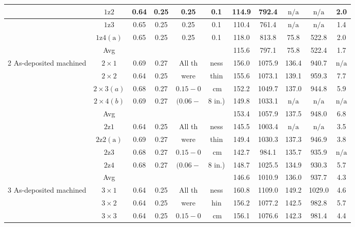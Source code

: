 \documentclass[10pt]{article}
\begin{document}
\begin{center}
\begin{tabular}{|c|c|c|c|c|c|c|c|c|c|c|}
\hline
 & $1 \mathrm{z} 2$ & 0.64 & 0.25 & 0.25 & 0.1 & 114.9 & 792.4 & $\mathrm{n} / \mathrm{a}$ & $\mathrm{n} / \mathrm{a}$ & 2.0 \\
\hline
 & $1 \mathrm{z} 3$ & 0.65 & 0.25 & 0.25 & 0.1 & 110.4 & 761.4 & $\mathrm{n} / \mathrm{a}$ & $\mathrm{n} / \mathrm{a}$ & 1.4 \\
\hline
 & $1 \mathrm{z} 4(\mathrm{a})$ & 0.65 & 0.25 & 0.25 & 0.1 & 118.0 & 813.8 & 75.8 & 522.8 & 2.0 \\
\hline
 & Avg &  &  &  &  & 115.6 & 797.1 & 75.8 & 522.4 & 1.7 \\
\hline
\multirow[t]{10}{*}{2 As-deposited machined} & $2 \times 1$ & 0.69 & 0.27 & All th & ness & 156.0 & 1075.9 & 136.4 & 940.7 & $\mathrm{n} / \mathrm{a}$ \\
\hline
 & $2 \times 2$ & 0.64 & 0.25 & were & thin & 155.6 & 1073.1 & 139.1 & 959.3 & 7.7 \\
\hline
 & $2 \times 3(a)$ & 0.68 & 0.27 & $0.15-0$ & $\mathrm{~cm}$ & 152.2 & 1049.7 & 137.0 & 944.8 & 5.9 \\
\hline
 & $2 \times 4(b)$ & 0.69 & 0.27 & $(0.06-$ & 8 in.) & 149.8 & 1033.1 & $\mathrm{n} / \mathrm{a}$ & $\mathrm{n} / \mathrm{a}$ & $\mathrm{n} / \mathrm{a}$ \\
\hline
 & Avg &  &  &  &  & 153.4 & 1057.9 & 137.5 & 948.0 & 6.8 \\
\hline
 & $2 \mathrm{z} 1$ & 0.64 & 0.25 & All th & ness & 145.5 & 1003.4 & $\mathrm{n} / \mathrm{a}$ & $\mathrm{n} / \mathrm{a}$ & 3.5 \\
\hline
 & $2 \mathrm{z} 2(\mathrm{a})$ & 0.69 & 0.27 & were & thin & 149.4 & 1030.3 & 137.3 & 946.9 & 3.8 \\
\hline
 & $2 \mathrm{z} 3$ & 0.68 & 0.27 & $0.15-0$ & $\mathrm{~cm}$ & 142.7 & 984.1 & 135.7 & 935.9 & $\mathrm{n} / \mathrm{a}$ \\
\hline
 & $2 \mathrm{z} 4$ & 0.68 & 0.27 & $(0.06-$ & 8 in.) & 148.7 & 1025.5 & 134.9 & 930.3 & 5.7 \\
\hline
 & Avg &  &  &  &  & 146.6 & 1010.9 & 136.0 & 937.7 & 4.3 \\
\hline
\multirow[t]{11}{*}{3 As-deposited machined} & $3 \times 1$ & 0.64 & 0.25 & All th & ness & 160.8 & 1109.0 & 149.2 & 1029.0 & 4.6 \\
\hline
 & $3 \times 2$ & 0.64 & 0.25 & were & hin & 156.2 & 1077.2 & 142.5 & 982.8 & 5.7 \\
\hline
 & $3 \times 3$ & 0.64 & 0.25 & $0.15-0$ & $\mathrm{~cm}$ & 156.1 & 1076.6 & 142.3 & 981.4 & 4.4 \\

\end{tabular}
\end{center}
\end{document}

